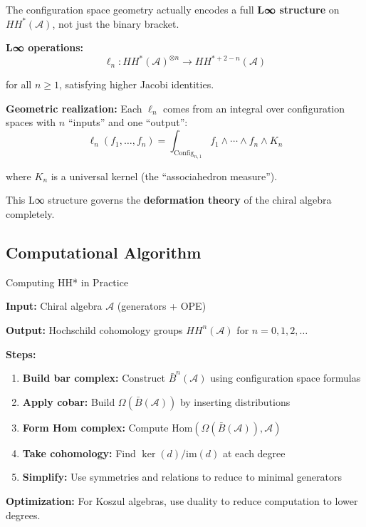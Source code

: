 \begin{remark}\label{rem:L-infty-structure}
The configuration space geometry actually encodes a full \textbf{L∞ structure} on
$HH^*(\mathcal{A})$, not just the binary bracket.

\textbf{L∞ operations:}
$$\ell_n: HH^{*}(\mathcal{A})^{\otimes n} \to HH^{*+2-n}(\mathcal{A})$$

for all $n \geq 1$, satisfying higher Jacobi identities.

\textbf{Geometric realization:} Each $\ell_n$ comes from an integral over configuration
spaces with $n$ ``inputs'' and one ``output'':
$$\ell_n(f_1, \ldots, f_n) = \int_{\text{Config}_{n,1}} f_1 \wedge \cdots \wedge f_n \wedge K_n$$

where $K_n$ is a universal kernel (the ``associahedron measure'').

This L∞ structure governs the \textbf{deformation theory} of the chiral algebra completely.
\end{remark}

\subsection{Computational Algorithm}

\begin{algorithm}[H]
\caption{Computing HH* in Practice}
\label{alg:compute-HH}

\textbf{Input:} Chiral algebra $\mathcal{A}$ (generators + OPE)

\textbf{Output:} Hochschild cohomology groups $HH^n(\mathcal{A})$ for $n = 0, 1, 2, \ldots$

\textbf{Steps:}
\begin{enumerate}
\item \textbf{Build bar complex:} Construct $\bar{B}^n(\mathcal{A})$ using configuration
space formulas

\item \textbf{Apply cobar:} Build $\Omega(\bar{B}(\mathcal{A}))$ by inserting distributions

\item \textbf{Form Hom complex:} Compute $\text{Hom}(\Omega(\bar{B}(\mathcal{A})), \mathcal{A})$

\item \textbf{Take cohomology:} Find $\ker(d) / \text{im}(d)$ at each degree

\item \textbf{Simplify:} Use symmetries and relations to reduce to minimal generators
\end{enumerate}

\textbf{Optimization:} For Koszul algebras, use duality to reduce computation to lower degrees.
\end{algorithm}

